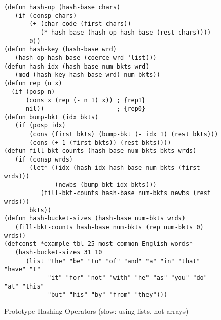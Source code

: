\begin{figure}
\begin{center}
\begin{Verbatim}
(defun hash-op (hash-base chars)
   (if (consp chars)
       (+ (char-code (first chars))
          (* hash-base (hash-op hash-base (rest chars))))
       0))
(defun hash-key (hash-base wrd)
   (hash-op hash-base (coerce wrd 'list)))
(defun hash-idx (hash-base num-bkts wrd)
   (mod (hash-key hash-base wrd) num-bkts))
(defun rep (n x)
  (if (posp n)
      (cons x (rep (- n 1) x)) ; {rep1}
      nil))                    ; {rep0}
(defun bump-bkt (idx bkts)
   (if (posp idx)
       (cons (first bkts) (bump-bkt (- idx 1) (rest bkts)))
       (cons (+ 1 (first bkts)) (rest bkts))))
(defun fill-bkt-counts (hash-base num-bkts bkts wrds)
   (if (consp wrds)
       (let* ((idx (hash-idx hash-base num-bkts (first wrds)))
              (newbs (bump-bkt idx bkts)))
          (fill-bkt-counts hash-base num-bkts newbs (rest wrds)))
       bkts))
(defun hash-bucket-sizes (hash-base num-bkts wrds)
   (fill-bkt-counts hash-base num-bkts (rep num-bkts 0) wrds))
(defconst *example-tbl-25-most-common-English-words*
   (hash-bucket-sizes 31 10
      (list "the" "be" "to" "of" "and" "a" "in" "that" "have" "I"
            "it" "for" "not" "with" "he" "as" "you" "do" "at" "this"
            "but" "his" "by" "from" "they")))
\end{Verbatim}
\caption{Prototype Hashing Operators (slow: using lists, not arrays)}
\label{fig:hash-defuns}
\end{center}
\end{figure}

